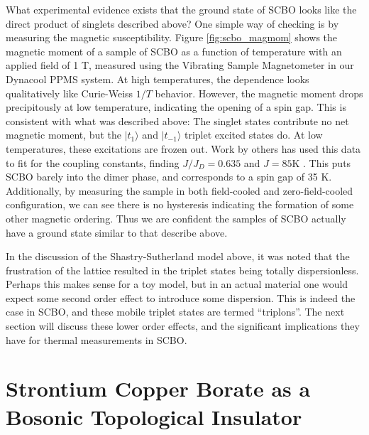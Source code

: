 \documentclass{thesis-umich}
\begin{document}
What experimental evidence exists that the ground state of SCBO looks like the direct product of singlets described above? One simple way of checking is by measuring the magnetic susceptibility. Figure \ref{fig:scbo_magmom} shows the magnetic moment of a sample of SCBO as a function of temperature with an applied field of 1 T, measured using the Vibrating Sample Magnetometer in our Dynacool PPMS system. At high temperatures, the dependence looks qualitatively like Curie-Weiss $1/T$ behavior. However, the magnetic moment drops precipitously at low temperature, indicating the opening of a spin gap. This is consistent with what was described above: The singlet states contribute no net magnetic moment, but the $|t_1\rangle$ and $|t_{-1}\rangle$ triplet excited states do. At low temperatures, these excitations are frozen out. Work by others has used this data to fit for the coupling constants, finding $J/J_D = 0.635$ and $J = 85$K \cite{Miyahara2000}. This puts SCBO barely into the dimer phase, and corresponds to a spin gap of 35 K. Additionally, by measuring the sample in both field-cooled and zero-field-cooled configuration, we can see there is no hysteresis indicating the formation of some other magnetic ordering. Thus we are confident the samples of SCBO actually have a ground state similar to that describe above.

In the discussion of the Shastry-Sutherland model above, it was noted that the frustration of the lattice resulted in the triplet states being totally dispersionless. Perhaps this makes sense for a toy model, but in an actual material one would expect some second order effect to introduce some dispersion. This is indeed the case in SCBO, and these mobile triplet states are termed ``triplons''. The next section will discuss these lower order effects, and the significant implications they have for thermal measurements in SCBO.

\section{Strontium Copper Borate as a Bosonic Topological Insulator}
\end{document}
